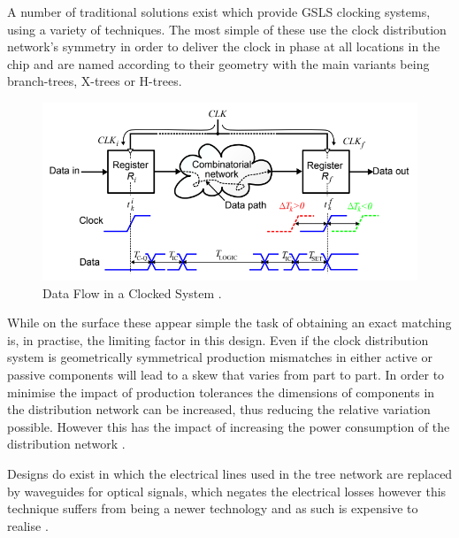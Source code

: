 \documentclass[11pt,english,british]{report}
\begin{document}
A number of traditional solutions exist which provide GSLS clocking systems, using a variety of techniques. The most simple of these use the clock distribution network's symmetry in order to deliver the clock in phase at all locations in the chip and are named according to their geometry with the main variants being branch-trees, X-trees or H-trees. %
\begin{figure}[h]
	\centering
	\includegraphics[scale=0.5]{../eldar_why_precise_clocking}
	\caption{Data Flow in a Clocked System \cite{zianbetov2013distributed}.}%
	\label{fig:trees}
\end{figure}
While on the surface these appear simple the task of obtaining an exact matching is, in practise, the limiting factor in this design. Even if the clock distribution system is geometrically symmetrical production mismatches in either active or passive components will lead to a skew that varies from part to part. In order to minimise the impact of production tolerances the dimensions of components in the distribution network can be increased, thus reducing the relative variation possible. However this has the impact of increasing the power consumption of the distribution network \cite{tiwari1998reducing}.

Designs do exist in which the electrical lines used in the tree network are replaced by waveguides for optical signals, which negates the electrical losses however this technique suffers from being a newer technology and as such is expensive to realise \cite{haurylau2006chip}.
\end{document}
